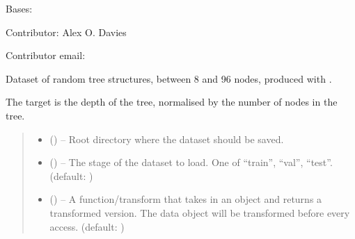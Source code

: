 \documentclass[letterpaper,10pt,english]{sphinxhowto}
\begin{document}
\begin{fulllineitems}
\label{\detokenize{datasets/synthetic:datasets.synthetic.TreeDataset}}
\pysigstartsignatures
{}
\pysigstopsignatures
\sphinxAtStartPar
Bases: 

\sphinxAtStartPar
Contributor: Alex O. Davies

\sphinxAtStartPar
Contributor email: 

\sphinxAtStartPar
Dataset of random tree structures, between 8 and 96 nodes, produced with .

\sphinxAtStartPar
The target is the depth of the tree, normalised by the number of nodes in the tree.
\begin{quote}\begin{description}
\begin{itemize}
\item {} 
\sphinxAtStartPar
{} () – Root directory where the dataset should be saved.

\item {} 
\sphinxAtStartPar
{} () – The stage of the dataset to load. One of “train”, “val”, “test”. (default: )

\item {} 
\sphinxAtStartPar
{} (\sphinxstyleliteralemphasis{\sphinxupquote{, }}) – A function/transform that takes in an  object and returns a transformed version. The data object will be transformed before every access. (default: )


\end{itemize}
\end{description}
\end{quote}
\end{fulllineitems}
\end{document}

